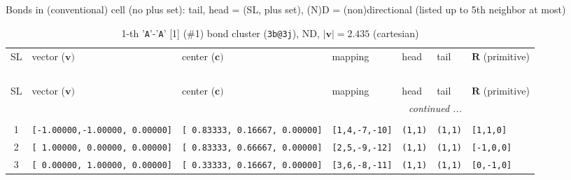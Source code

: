 \documentclass[fleqn,10pt,landscape]{jsarticle}
\begin{document}
\noindent Bonds in (conventional) cell (no plus set): tail, head = (SL, plus set), (N)D = (non)directional (listed up to 5th neighbor at most)

\renewcommand{\arraystretch}{1.6}
\begin{longtable}[l]{cllllll}
\captionsetup{justification=raggedright, singlelinecheck=off}
\caption{1-th '\texttt{A}'-'\texttt{A}' [1] (\#1) bond cluster (\texttt{3b@3j}), ND, $|\bm{v}|=2.435$ (cartesian)}
 \\
 \hline \hline
SL & vector ($\bm{v})$ & center ($\bm{c})$ & mapping & head & tail & $\bm{R}$ (primitive) \\ \hline \endfirsthead

\multicolumn{6}{l}{\tablename\ \thetable{}} \\
 \hline \hline
SL & vector ($\bm{v})$ & center ($\bm{c})$ & mapping & head & tail & $\bm{R}$ (primitive) \\ \hline \endhead

 \hline \hline
\multicolumn{6}{r}{\footnotesize\it continued ...} \\ \endfoot

 \hline \hline
\multicolumn{6}{r}{} \\ \endlastfoot

1 & \texttt{[-1.00000,-1.00000, 0.00000]} & \texttt{[ 0.83333, 0.16667, 0.00000]} & \texttt{[1,4,-7,-10]} & \texttt{(1,1)} & \texttt{(1,1)} & \texttt{[1,1,0]} \\ \hline
2 & \texttt{[ 1.00000, 0.00000, 0.00000]} & \texttt{[ 0.83333, 0.66667, 0.00000]} & \texttt{[2,5,-9,-12]} & \texttt{(1,1)} & \texttt{(1,1)} & \texttt{[-1,0,0]} \\ \hline
3 & \texttt{[ 0.00000, 1.00000, 0.00000]} & \texttt{[ 0.33333, 0.16667, 0.00000]} & \texttt{[3,6,-8,-11]} & \texttt{(1,1)} & \texttt{(1,1)} & \texttt{[0,-1,0]} \\
\end{longtable}
\renewcommand{\arraystretch}{1.6}
\end{document}
